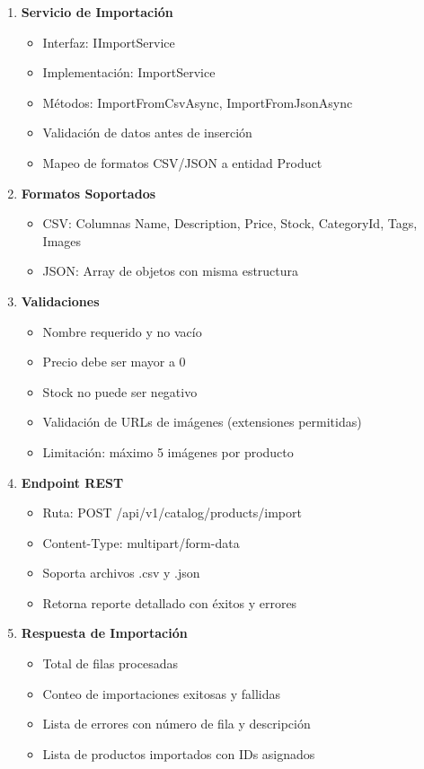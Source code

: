 \documentclass[12pt,a4paper]{article}
\begin{document}
\begin{enumerate}
    \item \textbf{Servicio de Importación}
    \begin{itemize}
        \item Interfaz: IImportService
        \item Implementación: ImportService
        \item Métodos: ImportFromCsvAsync, ImportFromJsonAsync
        \item Validación de datos antes de inserción
        \item Mapeo de formatos CSV/JSON a entidad Product
    \end{itemize}

    \item \textbf{Formatos Soportados}
    \begin{itemize}
        \item CSV: Columnas Name, Description, Price, Stock, CategoryId, Tags, Images
        \item JSON: Array de objetos con misma estructura
    \end{itemize}

    \item \textbf{Validaciones}
    \begin{itemize}
        \item Nombre requerido y no vacío
        \item Precio debe ser mayor a 0
        \item Stock no puede ser negativo
        \item Validación de URLs de imágenes (extensiones permitidas)
        \item Limitación: máximo 5 imágenes por producto
    \end{itemize}

    \item \textbf{Endpoint REST}
    \begin{itemize}
        \item Ruta: POST /api/v1/catalog/products/import
        \item Content-Type: multipart/form-data
        \item Soporta archivos .csv y .json
        \item Retorna reporte detallado con éxitos y errores
    \end{itemize}

    \item \textbf{Respuesta de Importación}
    \begin{itemize}
        \item Total de filas procesadas
        \item Conteo de importaciones exitosas y fallidas
        \item Lista de errores con número de fila y descripción
        \item Lista de productos importados con IDs asignados
    \end{itemize}
\end{enumerate}
\end{document}
